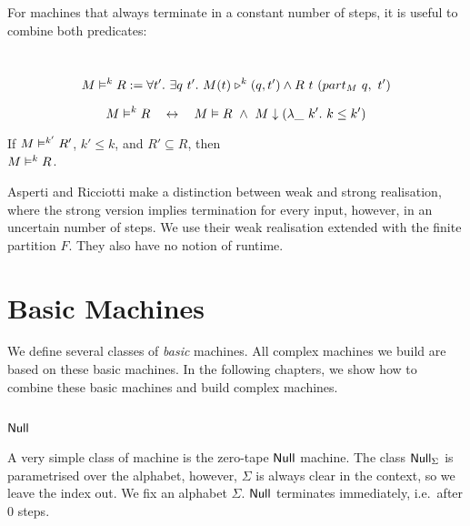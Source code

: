 For machines that always terminate in a constant number of steps, it is useful to combine both predicates:
\begin{definition}
  \label{def:RealiseIn}
  ~
  \[
    M \mathrel{\vDash^{k}} R :=
    \forall t'.~
    \exists q~t'.~
    M(t) \mathrel{\triangleright}^k(q, t') \land R~t~(part_M~q,~t')
  \]
\end{definition}

\begin{lemma}
  \label{lem:Realise_total}
  \[
    M \mathrel{\vDash^{k}} R
    \quad\mathbin{\leftrightarrow}\quad
    M \mathrel{\vDash} R ~\land~
    M \mathrel{\downarrow} (\lambda \_~k'.~k \le k')
  \]
\end{lemma}

\begin{lemma}
  \label{lem:RealiseIn_monotone}
  If $M \mathrel{\vDash^{k'}} R'$, $k' \leq k$, and $R' \subseteq R$, then \\
  $M \mathrel{\vDash^{k}} R$.
\end{lemma}

Asperti and Ricciotti \cite{asperti2015} make a distinction between weak and strong realisation, where the strong version implies termination for
every input, however, in an uncertain number of steps.  We use their weak realisation extended with the finite partition $F$.  They also have no
notion of runtime.


\section{Basic Machines}
\label{sec:basic_machines}

We define several classes of \textit{basic} machines.  All complex machines we build are based on these basic machines.  In the following chapters, we
show how to combine these basic machines and build complex machines.

\subsection{$\mathsf{Null}$}
\label{sec:Null}


A very simple class of machine is the zero-tape $\mathsf{Null}$ machine.  The class $\mathsf{Null}_\Sigma$ is parametrised over the alphabet, however,
$\Sigma$ is always clear in the context, so we leave the index out.  We fix an alphabet $\Sigma$.  $\mathsf{Null}$ terminates immediately, i.e.\ after $0$
steps.

